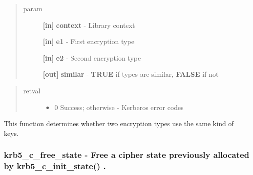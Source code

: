 \documentclass[letterpaper,10pt,english]{sphinxmanual}
\begin{document}
\begin{fulllineitems}
\label{appdev/refs/api/krb5_c_enctype_compare:c.krb5_c_enctype_compare}
\end{fulllineitems}

\begin{quote}\begin{description}
\item[{param}] \leavevmode
\textbf{{[}in{]}} \textbf{context} - Library context

\textbf{{[}in{]}} \textbf{e1} - First encryption type

\textbf{{[}in{]}} \textbf{e2} - Second encryption type

\textbf{{[}out{]}} \textbf{similar} - \textbf{TRUE} if types are similar, \textbf{FALSE} if not

\end{description}\end{quote}
\begin{quote}\begin{description}
\item[{retval}] \leavevmode\begin{itemize}
\item {} 
0   Success; otherwise - Kerberos error codes

\end{itemize}

\end{description}\end{quote}

This function determines whether two encryption types use the same kind of keys.


\subsubsection{krb5\_c\_free\_state -  Free a cipher state previously allocated by krb5\_c\_init\_state() .}
\label{appdev/refs/api/krb5_c_free_state:krb5-c-free-state-free-a-cipher-state-previously-allocated-by-krb5-c-init-state}\label{appdev/refs/api/krb5_c_free_state::doc}
\end{document}

